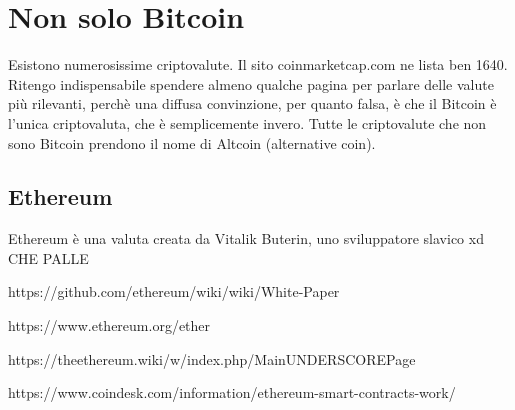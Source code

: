 \documentclass {article}
\begin{document}
\section {Non solo Bitcoin}


Esistono numerosissime criptovalute. Il sito coinmarketcap.com ne lista ben 1640. Ritengo indispensabile spendere almeno qualche pagina per parlare delle valute più rilevanti, perchè una diffusa convinzione, per quanto falsa, è che il Bitcoin è l'unica criptovaluta, che è semplicemente invero. Tutte le criptovalute che non sono Bitcoin prendono il nome di Altcoin (alternative coin).


\subsection {Ethereum}


Ethereum è una valuta creata da Vitalik Buterin, uno sviluppatore slavico xd CHE PALLE

https://github.com/ethereum/wiki/wiki/White-Paper

https://www.ethereum.org/ether

https://theethereum.wiki/w/index.php/MainUNDERSCOREPage

https://www.coindesk.com/information/ethereum-smart-contracts-work/
\end{document}

